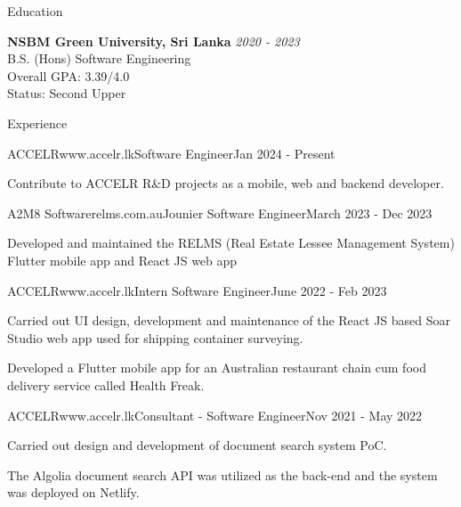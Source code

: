 \documentclass[
	11pt, %
]{./../assets/resume} %
\begin{document}

\begin{rSection}{Education}

	\textbf{NSBM Green University, Sri Lanka} \hfill \textit{2020 - 2023} \\ 
	B.S. (Hons) Software Engineering \\
	Overall GPA: 3.39/4.0 \\
	Status: Second Upper
	
\end{rSection}


\begin{rSection}{Experience}

	\begin{rSubsectionX}{ACCELR}{www.accelr.lk}{Software Engineer}{Jan 2024 - Present}
		\item Contribute to ACCELR R\&D projects as a mobile, web and backend developer.  
	\end{rSubsectionX}

	\begin{rSubsectionX}{A2M8 Software}{relms.com.au}{Jounier Software Engineer}{March 2023 - Dec 2023}
		\item Developed and maintained the RELMS (Real Estate Lessee Management System) Flutter mobile app and React JS web app
	\end{rSubsectionX}

	\begin{rSubsectionX}{ACCELR}{www.accelr.lk}{Intern Software Engineer}{June 2022 - Feb 2023}
		\item Carried out UI design, development and maintenance of the React JS based Soar Studio web app used for shipping container surveying.
		\item Developed a Flutter mobile app for an Australian restaurant chain cum food delivery service called Health Freak. 
	\end{rSubsectionX}

	\begin{rSubsectionX}{ACCELR}{www.accelr.lk}{Consultant - Software Engineer}{Nov 2021 - May 2022}
		\item Carried out design and development of document search system PoC.
		\item The Algolia document search API was utilized as the back-end and the system was deployed on Netlify.
	\end{rSubsectionX}

\end{rSection}
\end{document}
